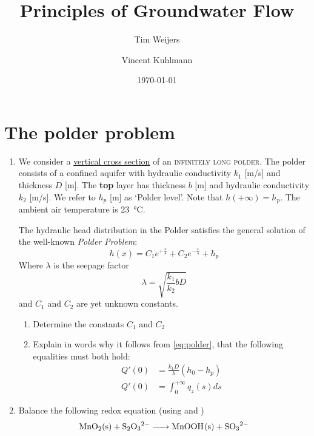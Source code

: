 \documentclass[a4paper]{article}
\title{Principles of Groundwater Flow}
\author{Tim Weijers \and Vincent Kuhlmann}
\date{\today}
\newcommand{\Ums}{[\si[per-mode=symbol]{\meter\per\second}]}
\newcommand{\Um}{[\si{\meter}]}
\begin{document}
\maketitle

{
\hypersetup{linkcolor=black}
\tableofcontents
}
\newpage

\section{The polder problem}
\begin{enumerate}

\item
We consider a \underline{vertical cross section} of an \textsc{infinitely long polder}. The polder consists of a confined aquifer with hydraulic conductivity $k_1$ \Ums{} and thickness $D$ \Um. The \textbf{top} layer has thickness $b$ \Um{} and hydraulic conductivity $k_2$ \Ums. We refer to $h_p$ \Um{} as `Polder level'. Note that $h(+\infty) = h_p$. The ambient air temperature is \SI{23}{\celsius}.

The hydraulic head distribution in the Polder satisfies the general solution of the well-known \emph{Polder Problem}\cite{alfonso2010}:
\begin{equation} \label{eq:polder}
h(x) = C_1e^{+\frac{x}{\lambda}} + C_2e^{-\frac{x}{\lambda}} + h_p
\end{equation}
Where $\lambda$ is the seepage factor
\begin{equation}
\lambda = \sqrt{\frac{k_1}{k_2}bD}
\end{equation}
and $C_1$ and $C_2$ are yet unknown constants.

\begin{enumerate}

\item Determine the constants $C_1$ and $C_2$
\item Explain in words why it follows from \autoref{eq:polder}, that the following equalities must both hold:
\begin{align*}
Q'(0) &= \frac{k_1D}{\lambda}(h_0 - h_p)\\[1em]
Q'(0) &= \int_0^{+\infty}q_z(s)ds
\end{align*}

\end{enumerate}

\item
Balance the following redox equation (using  and )
\begin{equation*}
\ce{MnO2(s) + S2O3^2- -> MnOOH(s) + SO3^2-}
\end{equation*}

\end{enumerate}
\end{document}
